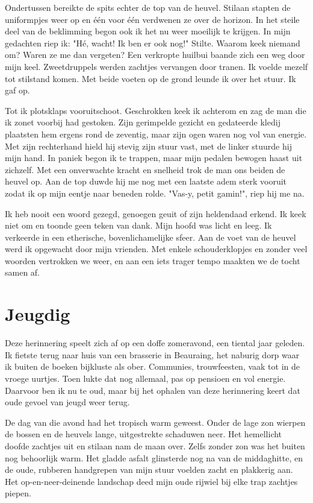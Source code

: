 \documentclass[12pt, justified, a4paper, symmetric]{tufte-book}
\begin{document}
Ondertussen bereikte de spits echter de top van de heuvel. Stilaan stapten de uniformpjes weer op en \'e\'en voor \'e\'en verdwenen ze over de horizon. In het steile deel van de beklimming begon ook ik het nu weer moeilijk te krijgen. In mijn gedachten riep ik: "H\'e, wacht! Ik ben er ook nog!" Stilte. Waarom keek niemand om? Waren ze me dan vergeten? Een verkropte huilbui baande zich een weg door mijn keel. Zweetdruppels werden zachtjes vervangen door tranen. Ik voelde mezelf tot stilstand komen. Met beide voeten op de grond leunde ik over het stuur. Ik gaf op.

Tot ik plotsklaps vooruitschoot. Geschrokken keek ik achterom en zag de man die ik zonet voorbij had gestoken. Zijn gerimpelde gezicht en gedateerde kledij plaatsten hem ergens rond de zeventig, maar zijn ogen waren nog vol van energie. Met zijn rechterhand hield hij stevig zijn stuur vast, met de linker stuurde hij mijn hand. In paniek begon ik te trappen, maar mijn pedalen bewogen haast uit zichzelf. Met een onverwachte kracht en snelheid trok de man ons beiden de heuvel op. Aan de top duwde hij me nog met een laatste adem sterk vooruit zodat ik op mijn eentje naar beneden rolde. "Vas-y, petit gamin!", riep hij me na.

Ik heb nooit een woord gezegd, genoegen geuit of zijn heldendaad erkend. Ik keek niet om en toonde geen teken van dank. Mijn hoofd was licht en leeg. Ik verkeerde in een etherische, bovenlichamelijke sfeer. Aan de voet van de heuvel werd ik opgewacht door mijn vrienden. Met enkele schouderklopjes en zonder veel woorden vertrokken we weer, en aan een iets trager tempo maakten we de tocht samen af.

\newpage
\section{Jeugdig}
Deze herinnering speelt zich af op een doffe zomeravond, een tiental jaar geleden. Ik fietste terug naar huis van een brasserie in Beauraing, het naburig dorp waar ik buiten de boeken bijkluste als ober. Communies, trouwfeesten, vaak tot in de vroege uurtjes. Toen lukte dat nog allemaal, pas op pensioen en vol energie. Daarvoor ben ik nu te oud, maar bij het ophalen van deze herinnering keert dat oude gevoel van jeugd weer terug.

De dag van die avond had het tropisch warm geweest. Onder de lage zon wierpen de bossen en de heuvels lange, uitgestrekte schaduwen neer. Het hemellicht doofde zachtjes uit en stilaan nam de maan over. Zelfs zonder zon was het buiten nog behoorlijk warm. Het gladde asfalt glinsterde nog na van de middaghitte, en de oude, rubberen handgrepen van mijn stuur voelden zacht en plakkerig aan. Het op-en-neer-deinende landschap deed mijn oude rijwiel bij elke trap zachtjes piepen.
\end{document}
